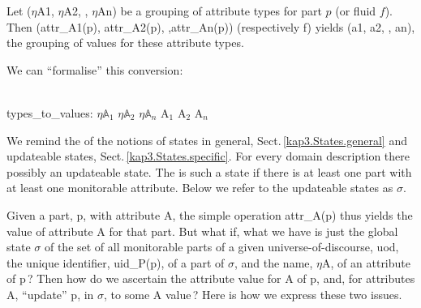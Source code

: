 \label{Calculating Attribute Values}

%

\begynd
\pind Let
      \textsf{($\eta$A1, $\eta$A2, {\DOTDOTDOT} , $\eta$An)} be
      a grouping of attribute types for part $p$ (or fluid $f$).
\pind Then \textsf{{(attr\_A1(p), attr\_A2(p), {\DOTDOTDOT} ,attr\_An(p))}}
\pind (respectively \textsf{f})
\pind yields \textsf{(a1, a2, {\DOTDOTDOT} , an)}, the grouping
      of values for these attribute types.

\pind We can ``formalise'' this conversion:

\bp
\>\ \\
\>\>\>types\_to\_values: $\eta$$\mathbb{A}_1$ {\TIMES} $\eta$$\mathbb{A}_2$ {\TIMES} {\DOTDOTDOT} {\TIMES} $\eta$$\mathbb{A}_n$ {\RIGHTARROW} A$_1$ {\TIMES} A$_2$ {\TIMES} {\DOTDOTDOT} {\TIMES} A$_n$
\ep

\afslut

\label{OoPDAs}

\begynd
\pind We remind the  of the notions  of 
\begynd 
\pind states in general, Sect.\,\ref{kap3.States.general} and 
\pind updateable states, Sect.\,\vref{kap3.States.specific}.
\begynd
\pind For every domain description there  possibly \ysf{} an updateable state.
\pind The is such a state if there is at least one part with at least
      one monitorable attribute.
\afslut
\pind Below we refer to the
      updateable states as $\sigma$.
\afslut
\afslut

\mnewfoil

\begynd
\pind Given a part, \textsf{p}, with attribute \textsf{A},
\begynd
\pind the simple operation \textsf{attr\_A(p)} 
\pind thus yields the value of attribute \textsf{A}
\pind for that part.
\afslut
\pind But what if,  what we have is just 
\begynd
\pind the global state $\sigma$\ysf{} of the set of all monitorable parts of a given
      universe-of-discourse, \textsf{uod},
\pind the unique identifier, \textsf{uid\_P(p)}, of a part of $\sigma$, and
\pind the name, \textsf{$\eta$A}, of an attribute of \textsf{p}\,?
\begynd
\pind Then how do we
\begynd
\pind ascertain the attribute value for \textsf{A} of \textsf{p},
\pind and, for  attributes \textsf{A},
\pind ``update'' \textsf{p}, in $\sigma$, to some \textsf{A} value\,?
\afslut
\pind Here is how we express these two issues.
\afslut
\afslut
\afslut

